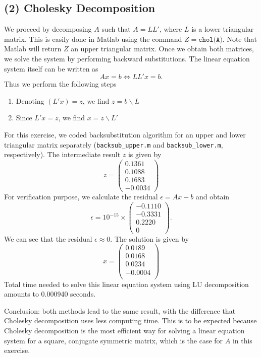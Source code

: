 \documentclass[11pt]{article}
\newcommand{\1}{\mathbbm{1}}
\begin{document}
\subsection*{(2) Cholesky Decomposition}
We proceed by decomposing $A$ such that $A=LL'$, where $L$ is a lower triangular matrix. This is easily done in Matlab using the command $Z= \texttt{chol(A)}$. Note that Matlab will return $Z$ an upper triangular matrix. Once we obtain both matrices, we solve the system by performing backward substitutions. The linear equation system itself can be written as 
\[Ax=b \Leftrightarrow LL'x =b.\]
Thus we perform the following steps
\begin{enumerate}
	\item Denoting $(L'x) =z$, we find $z = b\backslash L$
	\item Since $L'x = z$, we find $x=z\backslash L'$
\end{enumerate} 
For this exercise, we coded backsubstitution algorithm for an upper and lower triangular matrix separately (\texttt{backsub\_upper.m} and \texttt{backsub\_lower.m}, respectively). The intermediate result $z$ is given by
\[
z = \begin{pmatrix}
 0.1361\\
0.1088\\
0.1683\\
-0.0034
\end{pmatrix}
\]
For verification purpose, we calculate the residual $\epsilon = Ax-b$ and obtain
\[
\epsilon =   10^{-15} \times \begin{pmatrix}
   -0.1110\\
-0.3331\\
0.2220\\
0
\end{pmatrix}.
\]
We can see that the residual $\epsilon\approx0$. The solution is given by
\[x = \begin{pmatrix}
	0.0189\\
	0.0168\\
	0.0234\\
	-0.0004\\
\end{pmatrix}\]
Total time needed to solve this linear equation system using LU decomposition amounts to 0.000940 seconds.

Conclusion: both methods lead to the same result, with the difference that Cholesky decomposition uses less computing time. This is to be expected because Cholesky decomposition is the most efficient way for solving a linear equation system for a square, conjugate symmetric matrix, which is the case for $A$ in this exercise. 
\end{document}
